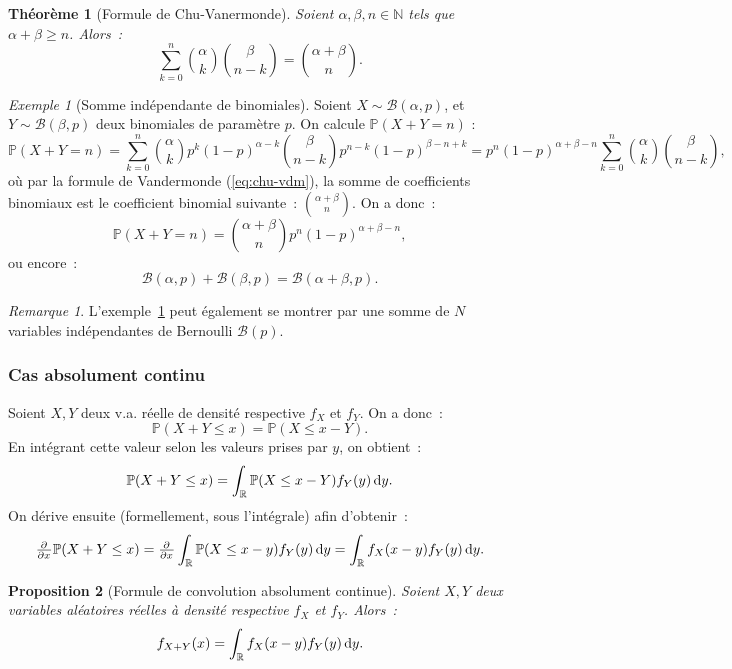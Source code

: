 \documentclass{article}
\newcommand{\N}{\mathbb N}
\renewcommand{\P}{\mathbb P}
\newcommand{\R}{\mathbb R}
\newtheorem{thm}{Théorème}[section]
\newtheorem{prp}[thm]{Proposition}
\theoremstyle{definition}
\theoremstyle{remark}
\newtheorem*{rmq}{Remarque}
\newtheorem{ex}{Exemple}
\begin{document}
		\begin{thm}[Formule de Chu-Vanermonde] Soient $\alpha, \beta, n \in \N$ tels que $\alpha + \beta \geq n$. Alors~:
		\begin{equation}\label{eq:chu-vdm}
			\sum_{k=0}^n\binom \alpha k\binom \beta{n-k} = \binom {\alpha+\beta}n.
		\end{equation}
		\end{thm}

		\begin{ex}[Somme indépendante de binomiales]\label{ex:sommeindébinom} Soient $X \sim \mathcal B(\alpha, p)$, et $Y \sim \mathcal B(\beta, p)$ deux
		binomiales de paramètre $p$. On calcule $\P(X+Y = n)$ :
		\[\P(X+Y = n) = \sum_{k=0}^n\binom \alpha kp^k(1-p)^{\alpha-k}\binom \beta{n-k}p^{n-k}(1-p)^{\beta-n+k}
		= p^n(1-p)^{\alpha+\beta-n}\sum_{k=0}^n\binom \alpha k\binom \beta{n-k},\]
		où par la formule de Vandermonde (\eqref{eq:chu-vdm}), la somme de coefficients binomiaux est le coefficient binomial suivante~: $\binom {\alpha+\beta}n$.
		On a donc~:
		\[\P(X+Y = n) = \binom {\alpha+\beta}np^n(1-p)^{\alpha+\beta-n},\]
		ou encore~:
		\[\mathcal B(\alpha, p) + \mathcal B(\beta, p) = \mathcal B(\alpha+\beta, p).\]
		\end{ex}

		\begin{rmq} L'exemple~\ref{ex:sommeindébinom} peut également se montrer par une somme de $N$ variables indépendantes de Bernoulli $\mathcal B(p)$.
		\end{rmq}

		\subsubsection{Cas absolument continu}
		Soient $X, Y$ deux v.a. réelle de densité respective $f_X$ et $f_Y$. On a donc~:
		\[\P(X+Y \leq x) = \P(X \leq x - Y).\]
		En intégrant cette valeur selon les valeurs prises par $y$, on obtient~:
		\[\P(X+Y \leq x) = \int_\R \P(X \leq x - Y)f_Y(y)\dif y.\]
		On dérive ensuite (formellement, sous l'intégrale) afin d'obtenir~:
		\[\pd {}x\P(X+Y \leq x) = \pd {}x\int_\R \P(X \leq x - y)f_Y(y)\dif y = \int_\R f_X(x-y)f_Y(y)\dif y.\]

		\begin{prp}[Formule de convolution absolument continue] Soient $X, Y$ deux variables aléatoires réelles à densité respective $f_X$ et $f_Y$. Alors~:
		\begin{equation}\label{eq:convabscont}
			f_{X+Y}(x) = \int_\R f_X(x-y)f_Y(y)\dif y.
		\end{equation}
		\end{prp}
\end{document}
